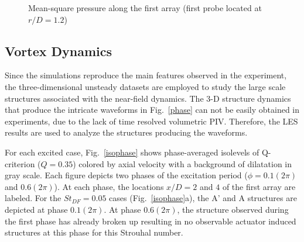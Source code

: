 \documentclass[english]{aiaa-tc}
\begin{document}
\begin{figure}
\centering{}
\caption{Mean-square pressure along the first array (first probe located at $r/D=1.2$)}\label{pms}
\end{figure}

\subsection{Vortex Dynamics}
Since the simulations reproduce the main features observed in the
experiment, the three-dimensional unsteady datasets are employed to
study the large scale structures associated with the near-field
dynamics. The 3-D structure dynamics that produce the intricate waveforms
in Fig.~\ref{phase} can not be easily obtained in experiments, due to the lack of time resolved volumetric PIV.
Therefore, the LES results are used to analyze the structures producing
the waveforms. 

For each excited case, Fig.~\ref{isophase} shows phase-averaged
isolevels of Q-criterion ($Q=0.35$) colored by axial velocity with a
background of dilatation in gray scale.  Each figure depicts two
phases of the excitation period ($\phi =0.1(2\pi)$ and $0.6(2\pi)$).
At each phase, the locations $x/D=2$ and $4$ of the first array are
labeled.  For the $St_{DF}=0.05$ cases (Fig.~\ref{isophase}a), the A'
and A structures are depicted at phase $0.1(2\pi)$. At phase
$0.6(2\pi)$, the structure observed during the first phase has already
broken up 
resulting in no observable actuator induced structures at this phase
for this Strouhal number.
\end{document}
